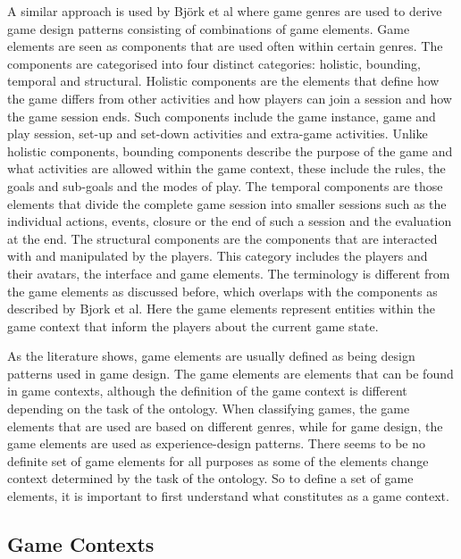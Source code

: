 \documentclass[11pt]{article}
\begin{document}
A similar approach is used by Bj\"ork et al \cite{Bjork2003, Bjork2003b} where game genres are used to derive game design patterns consisting of combinations of game elements. Game elements are seen as components that are used often within certain genres. The components are categorised into four distinct categories: holistic, bounding, temporal and structural. Holistic components are the elements that define how the game differs from other activities and how players can join a session and how the game session ends. Such components include the game instance, game and play session, set-up and set-down activities and extra-game activities. Unlike holistic components, bounding components describe the purpose of the game and what activities are allowed within the game context, these include the rules, the goals and sub-goals and the modes of play. The temporal components are those elements that divide the complete game session into smaller sessions such as the individual actions, events, closure or the end of 
such a session and the evaluation at the end. The structural components are the components that are interacted with and manipulated by the players. This category includes the players and their avatars, the interface and game elements. The terminology is different from the game elements as discussed before, which overlaps with the components as described by Bjork et al. Here the game elements represent entities within the game context that inform the players about the current game state.


As the literature shows, game elements are usually defined as being design patterns used in game design. The game elements are elements that can be found in game contexts, although the definition of the game context is different depending on the task of the ontology. When classifying games, the game elements that are used are based on different genres, while for game design, the game elements are used as experience-design patterns. There seems to be no definite set of game elements for all purposes as some of the elements change context determined by the task of the ontology. So to define a set of game elements, it is important to first understand what constitutes as a game context. 

\subsection{Game Contexts}
\end{document}
